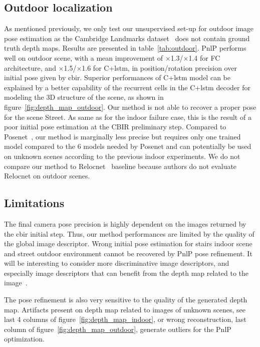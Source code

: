 

\subsection{Outdoor localization}
\label{subseq:outdoor}



As mentioned previously, we only test our unsupervised set-up for outdoor image pose estimation as the Cambridge Landmarks dataset~\citep{Kendall2015} does not contain ground truth depth maps. Results are presented in table~\ref{tab:outdoor}. PnlP performs well on outdoor scene, with a mean improvement of $\times$1.3/$\times$1.4 for FC architecture, and $\times$1.5/$\times$1.6 for C+\ac{lstm}, in position/rotation precision over initial pose given by \ac{cbir}. Superior performances of C+\ac{lstm} model can be explained by a better capability of the recurrent cells in the C+\ac{lstm} decoder for modeling the 3D structure of the scene, as shown in figure~\ref{fig:depth_map_outdoor}. Our method is not able to recover a proper pose for the scene Street. As same as for the indoor failure case, this is the result of a poor initial pose estimation at the CBIR preliminary step. Compared to Posenet~\citep{Kendall2017}, our method is marginally less precise but requires only one trained model compared to the 6 models needed by Posenet and can potentially be used on unknown scenes according to the previous indoor experiments. We do not compare our method to Relocnet~\citep{Purkait2018} baseline because authors do not evaluate Relocnet on outdoor scenes.





\subsection{Limitations}
The final camera pose precision is highly dependent on the images returned by the \ac{cbir} initial step. Thus, our method performances are limited by the quality of the global image descriptor. Wrong initial pose estimation for stairs indoor scene and street outdoor environment cannot be recovered by PnlP pose refinement. It will be interesting to consider more discriminative image descriptors, and especially image descriptors that can benefit from the depth map related to the image~\citep{Piasco2019}.

The pose refinement is also very sensitive to the quality of the generated depth map. Artifacts present on depth map related to images of unknown scenes, see last 4 columns of figure~\ref{fig:depth_map_indoor}, or wrong reconstruction, last column of figure~\ref{fig:depth_map_outdoor}, generate outliers for the PnlP optimization. 

